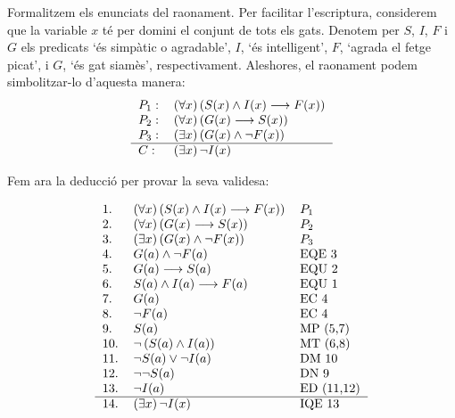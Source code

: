 Formalitzem els enunciats del raonament. Per facilitar l'escriptura,
considerem que la variable $x$ t\'{e} per domini el conjunt de tots els
gats. Denotem per $S$, $I$, $F$ i $G$ els predicats `\'{e}s simp\`{a}tic o
agradable', $I$, `\'{e}s intel\textperiodcentered ligent', $F$, `agrada el
fetge picat', i $G$, `\'{e}s gat siam\`{e}s', respectivament. Aleshores, el
raonament podem simbolitzar-lo d'aquesta manera:%
\begin{equation*}
\begin{tabular}{ll}
$P_{1}:$ & $\left( \forall x\right) \left( S(x)\wedge I(x)\longrightarrow
F(x)\right) $ \\
$P_{2}:$ & $\left( \forall x\right) \left( G(x)\longrightarrow S(x)\right) $
\\
$P_{3}:$ & $\left( \exists x\right) \left( G(x)\wedge\lnot F(x)\right) $ \\
\hline
$C:$ & $\left( \exists x\right) \lnot I(x)$%
\end{tabular}
\end{equation*}

Fem ara la deducci\'{o} per provar la seva validesa:

\begin{equation*}
\begin{tabular}{lll}
1. & $\left( \forall x\right) \left( S(x)\wedge I(x)\longrightarrow
F(x)\right) $ & $P_{1}$ \\
2. & $\left( \forall x\right) \left( G(x)\longrightarrow S(x)\right) $ & $%
P_{2}$ \\
3. & $\left( \exists x\right) \left( G(x)\wedge\lnot F(x)\right) $ & $P_{3}$
\\
4. & $G(a)\wedge\lnot F(a)$ & EQE 3 \\
5. & $G(a)\longrightarrow S(a)$ & EQU 2 \\
6. & $S(a)\wedge I(a)\longrightarrow F(a)$ & EQU 1 \\
7. & $G(a)$ & EC 4 \\
8. & $\lnot F(a)$ & EC 4 \\
9. & $S(a)$ & MP (5,7) \\
10. & $\lnot\left( S(a)\wedge I(a)\right) $ & MT (6,8) \\
11. & $\lnot S(a)\vee\lnot I(a)$ & DM 10 \\
12. & $\lnot\lnot S(a)$ & DN 9 \\
13. & $\lnot I(a)$ & ED (11,12) \\ \hline
14. & $\left( \exists x\right) \lnot I(x)$ & IQE 13%
\end{tabular}
\end{equation*}


